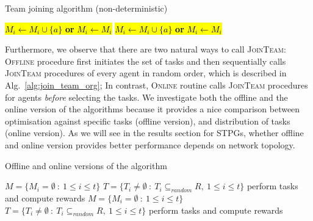 \documentclass{llncs}
\begin{document}
\begin{algorithm}[H]
\caption{Team joining algorithm (non-deterministic)}
\label{alg:join_team_nondet}
\begin{scriptsize}
\begin{algorithmic}
     
       
	 
	    \State \hl{$M_i \leftarrow M_i \cup \{a\}$  \textbf{or} $M_i \leftarrow M_i$} 
	\EndIf
       
	 
	  \State \hl{$M_i \leftarrow M_i \cup \{a\}$ \textbf{or} $M_i \leftarrow M_i$} 
	\EndIf
      \EndIf
    \EndIf
  \EndFor
\EndProcedure
\end{algorithmic}
\end{scriptsize}
\end{algorithm}

Furthermore, we observe that there are two natural ways to call \textsc{JoinTeam}: \textsc{Offline} procedure first initiates the set of tasks and then sequentially calls \textsc{JoinTeam} procedures of every agent in random order, which is described in Alg.~\ref{alg:join_team_org}; In contrast, \textsc{Online} routine calls \textsc{JoinTeam} procedures for agents \emph{before} selecting the tasks. We investigate both the offline and the online version of the algorithms because it provides a nice comparison between optimisation against specific tasks (offline version), and distribution of tasks (online version). As we will see in the results section for STPGs, whether offline and online version provides better performance depends on network topology.


\begin{algorithm}[H]
\caption{Offline and online versions of the algorithm}
\label{alg:main_process}
\begin{scriptsize}
\begin{algorithmic}
 
  \State $M = \{M_i = \emptyset\ :\ 1\leq i \leq t\}$ 
  \State $T = \{T_i\neq \emptyset\ :\ T_i \subseteq_{random} R,\ 1\leq i \leq t\}$ 
    \State {}
  \EndFor
  \State perform tasks and compute rewards
\EndProcedure
\Statex
{} 
  \State $M = \{M_i = \emptyset\ :\ 1\leq i \leq t\}$ 
    \State {}
  \EndFor
  \State $T = \{T_i\neq \emptyset\ :\ T_i \subseteq_{random} R,\ 1\leq i \leq t\}$ 
  \State perform tasks and compute rewards
\EndProcedure
\end{algorithmic}
\end{scriptsize}
\end{algorithm}
\end{document}
